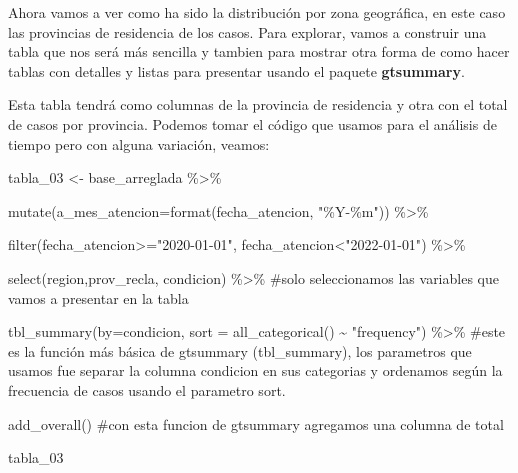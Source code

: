 \documentclass[
  letterpaper,
  DIV=11,
  numbers=noendperiod]{scrreprt}
\newenvironment{Shaded}{\begin{snugshade}}{\end{snugshade}}
\newcommand{\AttributeTok}[1]{\textcolor[rgb]{0.40,0.45,0.13}{#1}}
\newcommand{\CommentTok}[1]{\textcolor[rgb]{0.37,0.37,0.37}{#1}}
\newcommand{\FunctionTok}[1]{\textcolor[rgb]{0.28,0.35,0.67}{#1}}
\newcommand{\NormalTok}[1]{\textcolor[rgb]{0.00,0.23,0.31}{#1}}
\newcommand{\OtherTok}[1]{\textcolor[rgb]{0.00,0.23,0.31}{#1}}
\newcommand{\SpecialCharTok}[1]{\textcolor[rgb]{0.37,0.37,0.37}{#1}}
\newcommand{\StringTok}[1]{\textcolor[rgb]{0.13,0.47,0.30}{#1}}
\begin{document}
Ahora vamos a ver como ha sido la distribución por zona geográfica, en
este caso las provincias de residencia de los casos. Para explorar,
vamos a construir una tabla que nos será más sencilla y tambien para
mostrar otra forma de como hacer tablas con detalles y listas para
presentar usando el paquete \textbf{gtsummary}.

Esta tabla tendrá como columnas de la provincia de residencia y otra con
el total de casos por provincia. Podemos tomar el código que usamos para
el análisis de tiempo pero con alguna variación, veamos:

\begin{Shaded}
\begin{Highlighting}[]
\NormalTok{tabla\_03 }\OtherTok{\textless{}{-}}\NormalTok{ base\_arreglada }\SpecialCharTok{\%\textgreater{}\%}
  
  \FunctionTok{mutate}\NormalTok{(}\AttributeTok{a\_mes\_atencion=}\FunctionTok{format}\NormalTok{(fecha\_atencion, }\StringTok{"\%Y{-}\%m"}\NormalTok{)) }\SpecialCharTok{\%\textgreater{}\%} 
 
   \FunctionTok{filter}\NormalTok{(fecha\_atencion}\SpecialCharTok{\textgreater{}=}\StringTok{"2020{-}01{-}01"}\NormalTok{, fecha\_atencion}\SpecialCharTok{\textless{}}\StringTok{"2022{-}01{-}01"}\NormalTok{) }\SpecialCharTok{\%\textgreater{}\%} 
  
  \FunctionTok{select}\NormalTok{(region,prov\_recla, condicion) }\SpecialCharTok{\%\textgreater{}\%} \CommentTok{\#solo seleccionamos las variables que vamos a presentar en la tabla}
  
  \FunctionTok{tbl\_summary}\NormalTok{(}\AttributeTok{by=}\NormalTok{condicion, }\AttributeTok{sort =} \FunctionTok{all\_categorical}\NormalTok{() }\SpecialCharTok{\textasciitilde{}} \StringTok{"frequency"}\NormalTok{) }\SpecialCharTok{\%\textgreater{}\%} \CommentTok{\#este es la función más básica de gtsummary (tbl\_summary), los parametros que usamos fue separar la columna condicion en sus categorias y ordenamos según la frecuencia de casos usando el parametro sort.}
  
  \FunctionTok{add\_overall}\NormalTok{() }\CommentTok{\#con esta funcion de gtsummary agregamos una columna de total}

\NormalTok{tabla\_03}
\end{Highlighting}
\end{Shaded}
\end{document}
